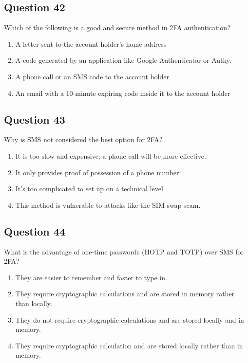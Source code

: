 \documentclass[12pt,a4paper]{article}
\begin{document}
\bigskip


\subsection*{Question 42}
Which of the following is a good and secure method in 2FA authentication?

\begin{enumerate}[label=\Alph*., leftmargin=*]
\item A letter sent to the account holder's home address
\item A code generated by an application like Google Authenticator or Authy.
\item A phone call or an SMS code to the account holder
\item An email with a 10-minute expiring code inside it to the account holder
\end{enumerate}

\bigskip


\subsection*{Question 43}
Why is SMS not considered the best option for 2FA?

\begin{enumerate}[label=\Alph*., leftmargin=*]
\item It is too slow and expensive; a phone call will be more effective.
\item It only provides proof of possession of a phone number.
\item It's too complicated to set up on a technical level.
\item This method is vulnerable to attacks like the SIM swap scam.
\end{enumerate}

\bigskip


\subsection*{Question 44}
What is the advantage of one-time passwords (HOTP and TOTP) over SMS for 2FA?

\begin{enumerate}[label=\Alph*., leftmargin=*]
\item They are easier to remember and faster to type in.
\item They require cryptographic calculations and are stored in memory rather than locally.
\item They do not require cryptographic calculations and are stored locally and in memory.
\item They require cryptographic calculation and are stored locally rather than in memory.
\end{enumerate}
\end{document}
